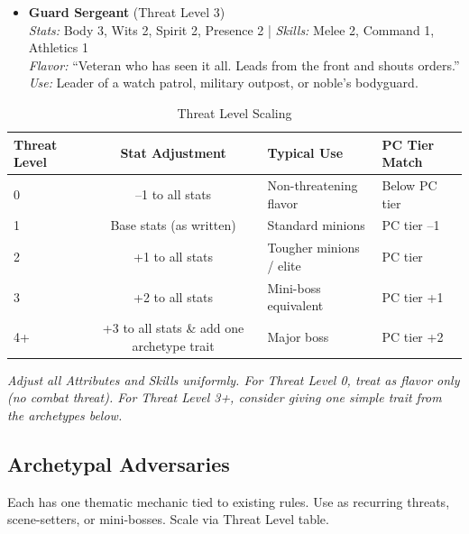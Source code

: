 \begin{itemize}
    \item \textbf{Guard Sergeant} (Threat Level 3) \\
    \textit{Stats:} Body 3, Wits 2, Spirit 2, Presence 2 \quad | \quad \textit{Skills:} Melee 2, Command 1, Athletics 1 \\
    \textit{Flavor:} ``Veteran who has seen it all. Leads from the front and shouts orders.'' \\
    \textit{Use:} Leader of a watch patrol, military outpost, or noble's bodyguard.
\end{itemize}

\begin{table}[htbp]
\centering
\caption{Threat Level Scaling}
\label{tab:threat-scaling}
\begin{tabular}{lcll}
\toprule
\textbf{Threat Level} & \textbf{Stat Adjustment} & \textbf{Typical Use} & \textbf{PC Tier Match} \\
\midrule
0 & --1 to all stats & Non-threatening flavor & Below PC tier \\
1 & Base stats (as written) & Standard minions & PC tier --1 \\
2 & +1 to all stats & Tougher minions / elite & PC tier \\
3 & +2 to all stats & Mini-boss equivalent & PC tier +1 \\
4+ & +3 to all stats \& add one archetype trait & Major boss & PC tier +2 \\
\bottomrule
\end{tabular}
\end{table}
\par\smallskip\textit{Adjust all Attributes and Skills uniformly. For Threat Level 0, treat as flavor only (no combat threat). For Threat Level 3+, consider giving one simple trait from the archetypes below.}

\subsection{Archetypal Adversaries}
\label{subsec:archetypal-adversaries}
Each has one thematic mechanic tied to existing rules. Use as recurring threats, scene-setters, or mini-bosses. Scale via Threat Level table.

